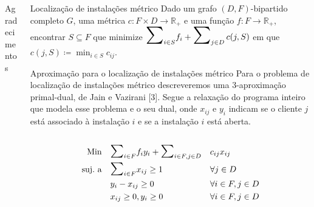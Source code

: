 \documentclass[final]{beamer}
\begin{document}
\begin{frame}[t]
\begin{columns}[t]
\begin{column}{0.47\paperwidth}
\begin{block}{Agradecimentos}
\end{block}
\end{column}

  \begin{column}{0.48\paperwidth}
    \begin{alertblock}{Localização de instalações métrico}
      Dado um grafo $(D,F)$-bipartido completo $G$, uma métrica $c : F \times D \rightarrow \mathbb{R}_+$ e uma função $f : F \rightarrow \mathbb{R}_+$, encontrar $S\subseteq F$ que minimize $\scalebox{2}{$\sum$}_{i\in S} f_i + \scalebox{2}{$\sum$}_{j \in D} \, c(j,S)$ em que $c(j,S) \coloneqq \min_{i \in S} c_{ij}$.
      
    \end{alertblock}

    \begin{block}{Aproximação para o localização de instalações métrico}
      Para o problema de localização de instalações métrico descreveremos uma 3-aproximação primal-dual, de Jain e Vazirani [3]. Segue a relaxação do programa inteiro que modela esse problema e o seu dual, onde $x_{ij}$ e $y_i$ indicam se o cliente $j$ está associado à instalação $i$ e se a instalação $i$ está aberta.

      \begin{shaded}
        \vspace{-.8cm}
      \begin{columns}
        \begin{column}{0.23\paperwidth}
          \begin{subequations}
            \begin{align*}
              \text{Min} \quad & \scalebox{1.5}{$\sum$}_{i \in F}f_iy_i + \scalebox{1.5}{$\sum$}_{i\in F,j\in D} &&c_{ij}x_{ij} \\
              \text{suj.\ a} \quad & \scalebox{1.5}{$\sum$}_{i\in F} x_{ij}\geq1 && \forall j \in D \\
              &y_i - x_{ij} \geq 0 && \forall i\in F,j\in D \\
              &x_{ij} \geq 0,y_i \geq 0 && \forall i\in F,j\in D \\
            \end{align*}
          \end{subequations}
        \end{column}
        
        
        

\end{columns}
\end{shaded}
\end{block}
\end{column}
\end{columns}
\end{frame}
\end{document}
